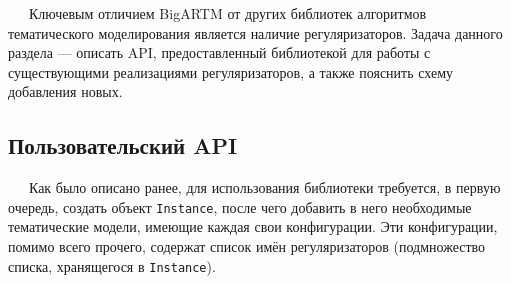 
$\quad\;\:$Ключевым отличием BigARTM от других библиотек алгоритмов тематического моделирования является наличие регуляризаторов. Задача данного раздела --- описать API, предоставленный библиотекой для работы с существующими реализациями регуляризаторов, а также пояснить схему добавления новых.

\subsection{Пользовательский API}

$\quad\;\:$Как было описано ранее, для использования библиотеки требуется, в первую очередь, создать объект \verb'Instance', после чего добавить в него необходимые тематические модели, имеющие каждая свои конфигурации. Эти конфигурации, помимо всего прочего, содержат список имён регуляризаторов (подмножество списка, хранящегося в \verb'Instance').

